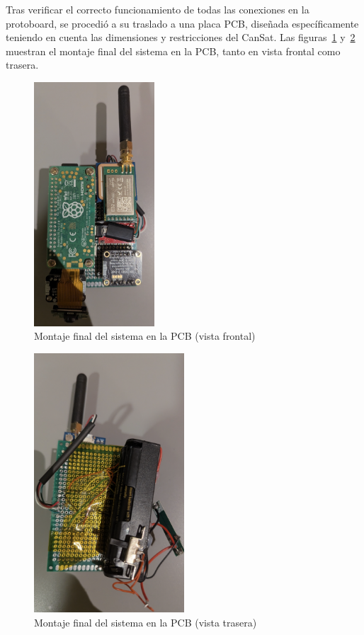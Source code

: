 Tras verificar el correcto funcionamiento de todas las conexiones en la protoboard, se procedió a su traslado a una placa PCB,
diseñada específicamente teniendo en cuenta las dimensiones y restricciones del CanSat.
Las figuras~\ref{fig:pcb_montaje_frontal} y~\ref{fig:montaje_trasero} muestran el montaje final del sistema en la PCB, tanto en vista frontal como trasera.


\begin{figure}[H]
    \centering
    \includegraphics[width=0.4\textwidth]{Imagenes/Bitmap/pcb_montaje_frontal}
    \caption{Montaje final del sistema en la PCB (vista frontal)}
    \label{fig:pcb_montaje_frontal}
\end{figure}

\begin{figure}[H]
    \centering
    \includegraphics[width=0.5\textwidth]{Imagenes/Bitmap/pcb_montaje_trasero}
    \caption{Montaje final del sistema en la PCB (vista trasera)}
    \label{fig:montaje_trasero}
\end{figure}


